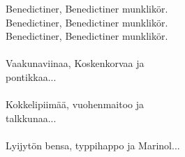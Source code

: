 
Benedictiner, Benedictiner munklikör. \\ Benedictiner, Benedictiner munklikör. \\ Benedictiner, Benedictiner munklikör. \\ \hspace{10mm} \\ Vaakunaviinaa, Koskenkorvaa ja \\ pontikkaa... \\ \hspace{10mm} \\ Kokkelipiimää, vuohenmaitoo ja \\ talkkunaa... \\ \hspace{10mm} \\ Lyijytön bensa, typpihappo ja Marinol...